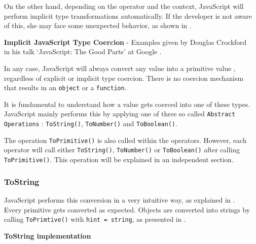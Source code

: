 On the other hand, depending on the operator and the context, JavaScript will perform implicit type transformations automatically. If the developer is not aware of this, she may face some unexpected behavior, as shown in .

\begin{code}
	\captionsetup{aboveskip=0pt, belowskip=10pt}
	\caption[Implicit JavaScript Type Coercion]{\textbf{Implicit JavaScript Type Coercion} - Examples given by Douglas Crockford in his talk `JavaScript: The Good Parts' at Google \citep{js-the-good-parts}.}
	\label{code:background-implicit-type-coercion}
\end{code}

In any case, JavaScript will always convert any value into a primitive value \citep{ecma-script}, regardless of explicit or implicit type coercion. There is no coercion mechanism that results in an \texttt{object} or a \texttt{function}.

It is fundamental to understand how a value gets coerced into one of these types. JavaScript mainly performs this by applying one of three so called \texttt{Abstract Operations} \citep{ecma-script}: \texttt{ToString()}, \texttt{ToNumber()} and \texttt{ToBoolean()}.

The operation \texttt{ToPrimitive()} is also called within the operators. However, each operator will call either \texttt{ToString()}, \texttt{ToNumber()} or \texttt{ToBoolean()} after calling \texttt{ToPrimitive()}. This operation will be explained in an independent section.

\subsubsection{ToString}
JavaScript performs this conversion in a very intuitive way, as explained in . Every primitive gets converted as expected. Objects are converted into strings by calling \texttt{ToPrimtive()} with \texttt{hint = string}, as presented in .

\begin{code}
	\captionsetup{aboveskip=0pt, belowskip=10pt}
	\caption[ToString implementation]{\textbf{ToString implementation}}
	\label{code:background-to-string-implementation}
\end{code}

